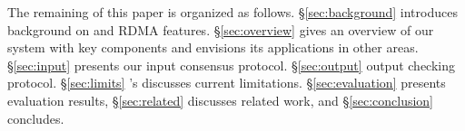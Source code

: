 
The remaining of this paper is organized as follows. \S\ref{sec:background} 
introduces background on \paxos and RDMA features. \S\ref{sec:overview} gives 
an overview of our \xxx system with key components and envisions its 
applications in other areas. \S\ref{sec:input} presents our input consensus 
protocol. \S\ref{sec:output} output checking protocol. \S\ref{sec:limits} 
\xxx's discusses current limitations. \S\ref{sec:evaluation} presents 
evaluation results, \S\ref{sec:related} discusses related work, and 
\S\ref{sec:conclusion} concludes.   